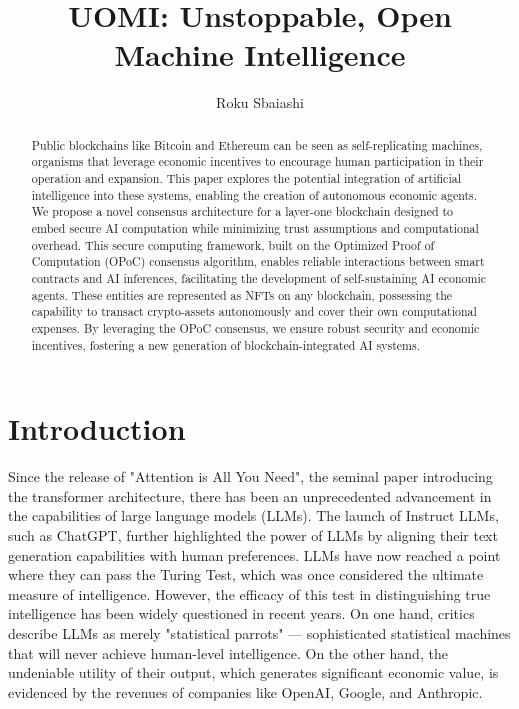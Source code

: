 \documentclass{article}
\title{UOMI: Unstoppable, Open Machine Intelligence}
\author{Roku Sbaiashi}
\begin{document}
\maketitle

\begin{abstract}


Public blockchains like Bitcoin and Ethereum can be seen as self-replicating machines, organisms that leverage economic incentives to encourage human participation in their operation and expansion. This paper explores the potential integration of artificial intelligence into these systems, enabling the creation of autonomous economic agents. We propose a novel consensus architecture for a layer-one blockchain designed to embed secure AI computation while minimizing trust assumptions and computational overhead. This secure computing framework, built on the Optimized Proof of Computation (OPoC) consensus algorithm, enables reliable interactions between smart contracts and AI inferences, facilitating the development of self-sustaining AI economic agents. These entities are represented as NFTs on any blockchain, possessing the capability to transact crypto-assets autonomously and cover their own computational expenses. By leveraging the OPoC consensus, we ensure robust security and economic incentives, fostering a new generation of blockchain-integrated AI systems.


\end{abstract}


\section{Introduction}

Since the release of "Attention is All You Need", the seminal paper introducing the transformer architecture, there has been an unprecedented advancement in the capabilities of large language models (LLMs). The launch of Instruct LLMs, such as ChatGPT, further highlighted the power of LLMs by aligning their text generation capabilities with human preferences. LLMs have now reached a point where they can pass the Turing Test, which was once considered the ultimate measure of intelligence. However, the efficacy of this test in distinguishing true intelligence has been widely questioned in recent years. On one hand, critics describe LLMs as merely "statistical parrots" — sophisticated statistical machines that will never achieve human-level intelligence. On the other hand, the undeniable utility of their output, which generates significant economic value, is evidenced by the revenues of companies like OpenAI, Google, and Anthropic.
\end{document}
